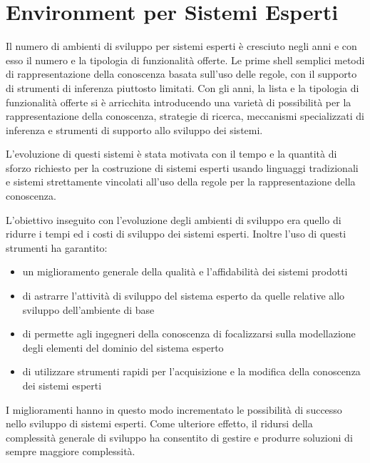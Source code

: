 \chapter{Environment per Sistemi Esperti}
Il numero di ambienti di sviluppo per sistemi esperti è cresciuto negli anni e con esso il numero e la tipologia di funzionalità offerte. Le prime shell semplici metodi di rappresentazione della conoscenza basata sull'uso delle regole, con il supporto di strumenti di inferenza piuttosto limitati. Con gli anni, la lista e la tipologia di funzionalità offerte si è arricchita introducendo una varietà di possibilità per la rappresentazione della conoscenza, strategie di ricerca, meccanismi specializzati di inferenza e strumenti di supporto allo sviluppo dei sistemi.

L'evoluzione di questi sistemi è stata motivata con il tempo e la quantità di sforzo richiesto per la costruzione di sistemi esperti usando linguaggi tradizionali e sistemi strettamente vincolati all'uso della regole per la rappresentazione della conoscenza.

L'obiettivo inseguito con l'evoluzione degli ambienti di sviluppo era quello di ridurre i tempi ed i costi di sviluppo dei sistemi esperti. Inoltre l'uso di questi strumenti ha garantito:
\begin{itemize}
	\item un miglioramento generale della qualità e l'affidabilità dei sistemi prodotti
	\item di astrarre l'attività di sviluppo del sistema esperto da quelle relative allo sviluppo dell'ambiente di base
	\item di permette agli ingegneri della conoscenza di focalizzarsi sulla modellazione degli elementi del dominio del sistema esperto
	\item di utilizzare strumenti rapidi per l'acquisizione e la modifica della conoscenza dei sistemi esperti
\end{itemize}

I miglioramenti hanno in questo modo incrementato le possibilità di successo nello sviluppo di sistemi esperti. Come ulteriore effetto, il ridursi della complessità generale di sviluppo ha consentito di gestire e produrre soluzioni di sempre maggiore complessità.

